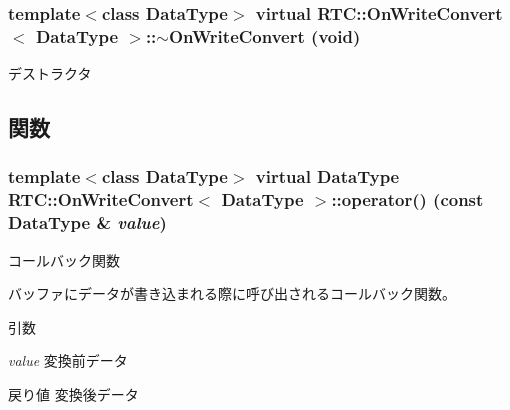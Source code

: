 \subsubsection[{$\sim$OnWriteConvert}]{\setlength{\rightskip}{0pt plus 5cm}template$<$class DataType$>$ virtual {\bf RTC::OnWriteConvert}$<$ DataType $>$::$\sim${\bf OnWriteConvert} (void)\hspace{0.3cm}{\ttfamily  [inline, virtual]}}\label{structRTC_1_1OnWriteConvert_a3ac98bc92ec58ac5c51a685958563829}
デストラクタ 

\subsection{関数}
\subsubsection[{operator()}]{\setlength{\rightskip}{0pt plus 5cm}template$<$class DataType$>$ virtual DataType {\bf RTC::OnWriteConvert}$<$ DataType $>$::operator() (const DataType \& {\em value})\hspace{0.3cm}{\ttfamily  [pure virtual]}}\label{structRTC_1_1OnWriteConvert_a977a309e15012a5f7c30497b1c20341c}


コールバック関数 

バッファにデータが書き込まれる際に呼び出されるコールバック関数。


\begin{DoxyParams}{引数}
\item[{\em value}]変換前データ \end{DoxyParams}
\begin{DoxyReturn}{戻り値}
変換後データ 
\end{DoxyReturn}

